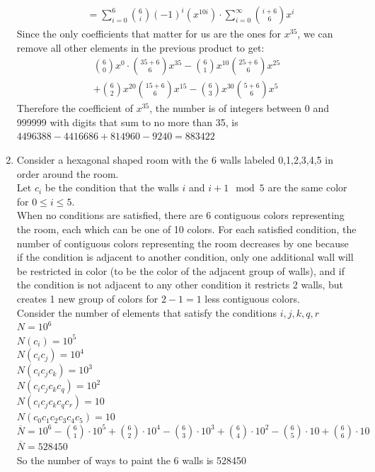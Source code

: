 \documentclass[11pt]{article}
\begin{document}
\begin{enumerate}[]
\begin{align}
		&=\sum_{i=0}^{6} \binom{6}{i}(-1)^i(x^{10i}) \cdot \sum_{i=0}^{\infty} \binom{i+6}{6}x^i  \nonumber
	\end{align}
Since the only coefficients that matter for us are the ones for $x^{35}$, we can remove all other elements in the previous product to get:
	\begin{align}
	\binom{6}{0}x^0\cdot\binom{35+6}{6}x^{35}-\binom{6}{1}x^{10}\binom{25+6}{6}x^{25} \nonumber\\ +\binom{6}{2}x^{20}\binom{15+6}{6}x^{15}-\binom{6}{3}x^{30}\binom{5+6}{6}x^{5} \nonumber
	\end{align}
Therefore the coefficient of $x^{35}$, the number is of integers between 0 and 999999 with digits that sum to no more than 35, is $4496388-4416686+814960-9240=883422$
\item
Consider a hexagonal shaped room with the 6 walls labeled 0,1,2,3,4,5 in order around the room.\\
Let $c_i$ be the condition that the walls $i$ and $i+1\mod 5$ are the same color for $0\leq i\leq5$.\\
When no conditions are satisfied, there are 6 contiguous colors representing the room, each which can be one of 10 colors. For each satisfied condition, the number of contiguous colors representing the room decreases by one because if the condition is adjacent to another condition, only one additional wall will be restricted in color (to be the color of the adjacent group of walls), and if the condition is not adjacent to any other condition it restricts 2 walls, but creates 1 new group of colors for $2-1=1$ less contiguous colors.\\
Consider the number of elements that satisfy the conditions $i,j,k,q,r$\\
$N=10^6$\\
$N(c_i)=10^5$\\
$N({c_i}{c_j})=10^4$\\
$N({c_i}{c_j}{c_k})=10^3$\\
$N({c_i}{c_j}{c_k}{c_q})=10^2$\\
$N({c_i}{c_j}{c_k}{c_q}{c_r})=10$\\
$N({c_0}{c_1}{c_2}{c_3}{c_4}{c_5})=10$\\
$\overline{N} = 10^6 - \binom{6}{1}\cdot 10^5 + \binom{6}{2}\cdot 10^4 - \binom{6}{3}\cdot 10^3 + \binom{6}{4}\cdot 10^2 - \binom{6}{5}\cdot 10 + \binom{6}{6}\cdot 10$\\
$\overline{N} = 528450$\\
So the number of ways to paint the 6 walls is 528450

\end{enumerate}
\end{document}
